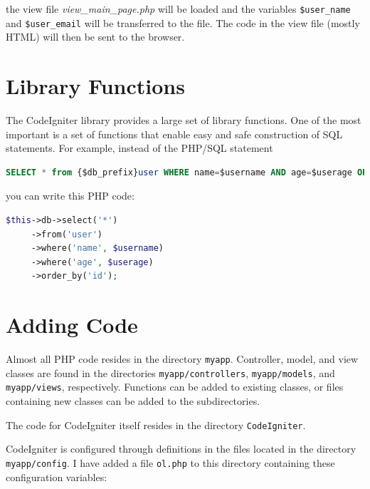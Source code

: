 \documentclass[11pt,oneside,a4paper]{memoir}
\begin{document}
\noindent
the view file \emph{view\_main\_page.php} will be loaded and the variables \texttt{\$user\_name} and
\texttt{\$user\_email} will be transferred to the file. The code in the view file (mostly HTML) will
then be sent to the browser.

\section{Library Functions}

The CodeIgniter library provides a large set of library functions. One of the most important is a
set of functions that enable easy and safe construction of SQL statements. For example,
instead of the PHP/SQL statement

\begin{lstlisting}[language=SQL]
SELECT * from {$db_prefix}user WHERE name=$username AND age=$userage ORDER BY id;
\end{lstlisting}

\noindent
you can write this PHP code:

\begin{lstlisting}[language=PHP]
$this->db->select('*')
     ->from('user')
     ->where('name', $username)
     ->where('age', $userage)
     ->order_by('id');
\end{lstlisting}

\section{Adding Code}

Almost all PHP code resides in the directory \texttt{myapp}. Controller,
model, and view classes are found in the directories
\texttt{myapp/controllers}, \texttt{myapp/models}, and \texttt{myapp/views}, respectively. Functions
can be added to existing classes, or files containing new classes can be added to the
subdirectories.

The code for CodeIgniter itself resides in the directory \texttt{CodeIgniter}.

CodeIgniter is configured through definitions in the files located in the directory
\texttt{myapp/config}. I have added a file \texttt{ol.php} to this directory
containing these configuration variables:
\end{document}
